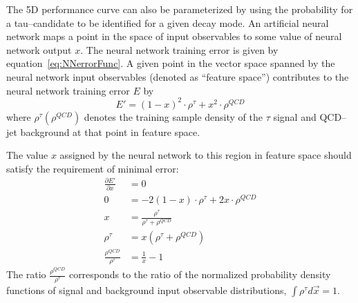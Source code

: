 The 5D performance curve can also be parameterized by using the probability for
a tau--candidate to be identified for a given decay mode.  
An artificial neural network maps a point in the space of input observables to
some value of neural network output $x$.  The neural network training error is
given by equation~\ref{eq:NNerrorFunc}.  A given point in the vector space
spanned by the neural network input observables (denoted as ``feature space'')
contributes to the neural network training error $E$ by 
\begin{equation}
   E' = (1 - x)^2\cdot\rho^\tau + x^2\cdot\rho^{QCD}
\end{equation}
where $\rho^\tau (\rho^{QCD})$ denotes the training sample density of the
$\tau$ signal and QCD--jet background at that point in feature space.

The value $x$ assigned by the neural network to this region in feature space
should satisfy the requirement of minimal error:
\begin{align}
   \frac{\partial E'}{\partial x} &= 0 \nonumber \\ 
   0 &= -2(1-x)\cdot\rho^\tau+2x\cdot\rho^{QCD} \nonumber \\ 
   x &= \frac{\rho^\tau} {\rho^\tau + \rho^{QCD}} \label{eq:probFracToX} \\ 
   \rho^\tau &= x(\rho^\tau + \rho^{QCD}) \nonumber \\ 
   \frac{\rho^{QCD}}{\rho^\tau} &= \frac{1}{x} - 1  \label{eq:rawTransformX}
\end{align}
The ratio $\frac{\rho^{QCD}}{\rho^\tau}$ corresponds to the ratio of
the normalized probability density functions of signal and background input
observable distributions, \ie $\int \rho^{\tau} d\vec x = 1$.

